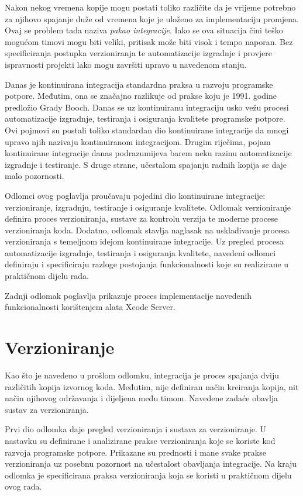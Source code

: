 \documentclass[times, utf8, diplomski, numeric]{fer}
\begin{document}
Nakon nekog vremena kopije mogu postati toliko različite da je vrijeme potrebno za njihovo spajanje duže od vremena koje je uloženo za implementaciju promjena. Ovaj se problem tada naziva \textit{pakao integracije}. Iako se ova situacija čini teško mogućom timovi mogu biti veliki, pritisak može biti visok i tempo naporan. Bez specificiranja postupka verzioniranja te automatizacije izgradnje i provjere ispravnosti projekti lako mogu završiti upravo u navedenom stanju.

Danas je kontinuirana integracija standardna praksa u razvoju programske potpore. Međutim, ona se značajno razlikuje od prakse koju je 1991. godine predložio Grady Booch. Danas se uz kontinuiranu integraciju usko vežu procesi automatizacije izgradnje, testiranja i osiguranja kvalitete programske potpore. Ovi pojmovi su postali toliko standardan dio kontinuirane integracije da mnogi upravo njih nazivaju kontinuiranom integracijom. Drugim riječima, pojam kontinuirane integracije danas podrazumijeva barem neku razinu automatizacije izgradnje i testiranje. S druge strane, učestalom spajanju radnih kopija se daje malo pozornosti. 

Odlomci ovog poglavlja proučavaju pojedini dio kontinuirane integracije: verzioniranje, izgradnju, testiranje i osiguranje kvalitete. Odlomak verzioniranje definira proces verzioniranja, sustave za kontrolu verzija te moderne procese verzioniranja koda. Dodatno, odlomak stavlja naglasak na usklađivanje procesa verzioniranja s temeljnom idejom kontinuirane integracije. Uz pregled procesa automatizacije izgradnje, testiranja i osiguranja kvalitete, navedeni odlomci definiraju i specificiraju razloge postojanja funkcionalnosti koje su realizirane u praktičnom dijelu rada.

Zadnji odlomak poglavlja prikazuje proces implementacije navedenih funkcionalnosti korištenjem alata Xcode Server.

\section{Verzioniranje}

Kao što je navedeno u prošlom odlomku, integracija je proces spajanja dviju različitih kopija izvornog koda. Međutim, nije definiran način kreiranja kopija, nit način njihovog održavanja i dijeljena među timom. Navedene zadaće obavlja sustav za verzioniranja.

Prvi dio odlomka daje pregled verzioniranja i sustava za verzioniranje. U nastavku su  definirane i analizirane prakse verzioniranja koje se koriste kod razvoja programske potpore. Prikazane su prednosti i mane svake prakse verzioniranja uz posebnu pozornost na učestalost obavljanja integracije. Na kraju odlomka je specificirana praksa verzioniranja koja se koristi u praktičnom dijelu ovog rada.
\end{document}
